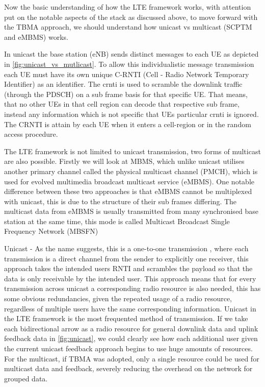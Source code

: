 \documentclass{article}
\begin{document}
Now the basic understanding of how the LTE framework works, with attention put on the notable aspects of the stack as discussed above, to move forward with the TBMA approach, we should understand how unicast vs multicast (SCPTM and eMBMS) works.

In unicast the base station (eNB) sends distinct messages to each \ac{UE} as depicted in \cref{fig:unicast_vs_mutlicast}. To allow this individualistic message transmission each \ac{UE} must have its own unique C-RNTI (Cell - Radio Network Temporary Identifier) as an identifier. The \ac{crnti} is used to scramble the downlink traffic (through the PDSCH) on a sub frame basis for that specific \ac{UE}. That means, that no other UEs in that cell region can decode that respective sub frame, instead any information which is not specific that UEs particular \ac{crnti} is ignored. The CRNTI is attain by each UE when it enters a cell-region \cite[Table 7.11]{3gpp36321} or in the random access procedure.  

The LTE framework is not limited to unicast transmission, two forms of multicast are also possible. Firstly we will look at MBMS, which unlike unicast utilises another primary channel called the physical multicast channel (PMCH), which is used for evolved multimedia broadcast multicast service (eMBMS). One notable difference between these two approaches is that eMBMS cannot be multiplexed with unicast, this is due to the structure of their sub frames differing. The multicast data from eMBMS is usually transmitted from many synchronised base station at the same time, this mode is called Multicast Broadcast Single Frequency Network (MBSFN)  

Unicast - As the name suggests, this is a one-to-one transmission , where each transmission is a direct channel from the sender to explicitly one receiver, this approach takes the intended users RNTI and scrambles the payload so that the data is only receivable by the intended user. This approach means that for every transmission across unicast a corresponding radio resource is also needed, this has some obvious redundancies, given the repeated usage of a radio resource, regardless of multiple users have the same corresponding information. Unicast in the LTE framework is the most frequented method of transmission. If we take each bidirectional arrow as a radio resource for general downlink data and uplink feedback data in \cref{fig:unicast}, we could clearly see how each additional user given the current unicast feedback approach begins to use huge amounts of resources. For the multicast, if TBMA was adopted, only a single resource could be used for multicast data and feedback, severely reducing the overhead on the network for grouped data. 
\end{document}
